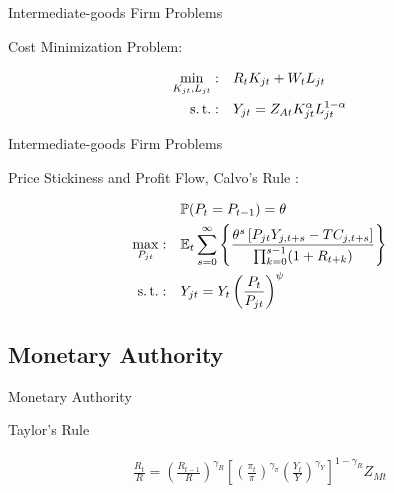 \documentclass[
presentation.tex
]{subfiles}
\begin{document}
	\begin{frame}{Intermediate-goods Firm Problems}
		
	Cost Minimization Problem:	
	
	\begin{align}
		\label{eq:int-good-firm-total-cost}
		\min_{K_{jt}, L_{jt}}: \quad & R_t K_{jt} + W_t L_{jt} \\
		\label{eq:int-good-firm-production-function}
		\operatorname{s.t.}: \quad & Y_{jt} = Z_{At} K_{jt}^\alpha L_{jt}^{1-\alpha}
	\end{align}	
				
	\end{frame}


\begin{frame}{Intermediate-goods Firm Problems}
	
	Price Stickiness and Profit Flow, Calvo's Rule \cite{calvo_staggered_1983}:
	
	\begin{align}
		& \quad \mathbb{P}(P_t=P_{t-1})=\theta \\
		\max_{P_{jt}}: & \quad \E \sum_{s=0}^{\infty} \left\{ \frac{ \theta^s \left[ P_{jt} Y_{j,t+s} - TC_{j,t+s} \right] }{\prod_{k=0}^{s-1}(1+R_{t+k})} \right\} \label{eq:int-good-firm-optimal-price-problem} \\
		\st: & \quad Y_{jt} = Y_t \left( \frac{P_t}{P_{jt}} \right)^{\psi} %
	\end{align}	
	
\end{frame}


\subsection{Monetary Authority}

\begin{frame}{Monetary Authority}
	
	Taylor's Rule \cite{taylor_discretion_1993}
	
	\begin{align}
		\label{eq:monetary-policy}
		\frac{R_t}{R} =
		\left( \frac{R_{t-1}}{R} \right)^{\gamma_R}  \left[
		\left( \frac{\pi_t}{\pi} \right)^{\gamma_\pi}
		\left( \frac{Y_t}{Y} \right)^{\gamma_Y} \right]^{1-\gamma_R} Z_{Mt}
	\end{align}	
	
	
\end{frame}
\end{document}
